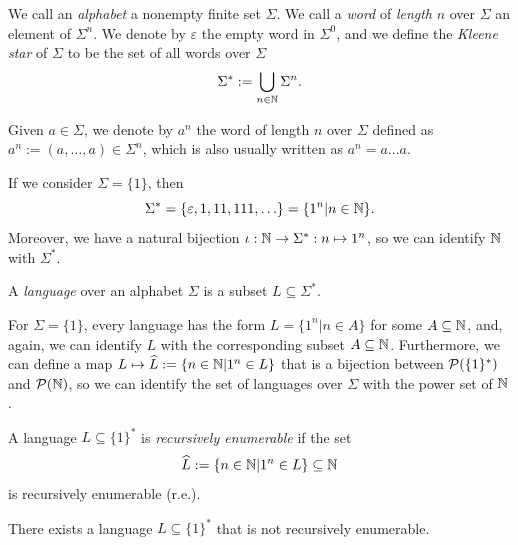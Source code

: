 \begin{definition}
    We call an \emph{alphabet} a nonempty finite set $\Sigma$. We call a \emph{word} of \emph{length} $n$ over $\Sigma$ an element of $\Sigma^n$.
    We denote by $\varepsilon$ the empty word in $\Sigma^0$, and we define the \emph{Kleene star} of $\Sigma$ to be the set of all words over $\Sigma$
    \[ \Sigma^* := \bigcup_{n \in \mathbb{N}} \Sigma^n. \]
\end{definition}

\begin{notation}
    Given $a \in \Sigma$, we denote by $a^n$ the word of length $n$ over $\Sigma$ defined as $a^n := (a,\ldots,a) \in \Sigma^n$, which is also usually written as $a^n = a \ldots a$.
\end{notation}

\begin{example}
    If we consider $\Sigma = \{1\}$, then
    \[ \Sigma^* = \{\varepsilon, 1, 11, 111, \ldots\} = \{1^n | n \in \mathbb{N}\}. \]
    Moreover, we have a natural bijection $\iota : \mathbb{N} \to \Sigma^* : n \mapsto 1^n$, so we can identify $\mathbb{N}$ with $\Sigma^*$.
\end{example}

\begin{definition}[Language]
    A \emph{language} over an alphabet $\Sigma$ is a subset $L \subseteq \Sigma^*$.
\end{definition}

\begin{example}
    For $\Sigma = \{1\}$, every language has the form $L = \{1^n | n \in A\}$ for some $A \subseteq \mathbb{N}$,
    and, again, we can identify $L$ with the corresponding subset $A \subseteq \mathbb{N}$.
    Furthermore, we can define a map $L \mapsto \widehat L := \{n \in \mathbb{N} | 1^n \in L\}$ that is a bijection between $\mathcal{P}(\{1\}^*)$
    and $\mathcal{P}(\mathbb{N})$, so we can identify the set of languages over $\Sigma$ with the power set of $\mathbb{N}$.
\end{example}

\begin{definition}
    A language $L \subseteq \{1\}^*$ is \emph{recursively enumerable} if the set
    \[ \widehat L := \{n \in \mathbb{N} | 1^n \in L\} \subseteq \mathbb{N} \]
    is recursively enumerable (r.e.).
\end{definition}

\begin{theorem}
    There exists a language $L \subseteq \{1\}^*$ that is not recursively enumerable.
\end{theorem}

